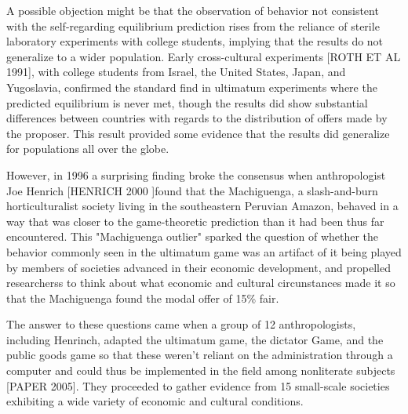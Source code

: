 \message{ !name(tese.tex)}\documentclass{article}
\begin{document}
A possible objection might be that the observation of behavior not consistent with the self-regarding equilibrium prediction rises from the reliance of sterile laboratory experiments with college students, implying that the results do not generalize to a wider population. Early cross-cultural experiments [ROTH ET AL 1991], with college students from Israel, the United States, Japan, and Yugoslavia, confirmed the standard find in ultimatum experiments where the predicted equilibrium is never met, though the results did show substantial differences between countries with regards to the distribution of offers made by the proposer. This result provided some evidence that the results did generalize for populations all over the globe. 




However, in 1996 a surprising finding broke the consensus when anthropologist Joe Henrich [HENRICH 2000 ]found that the Machiguenga, a slash-and-burn horticulturalist society living in the southeastern Peruvian Amazon, behaved in a way that was closer to the game-theoretic prediction than it had been thus far encountered. This "Machiguenga outlier" sparked the question of whether the behavior commonly seen in the ultimatum game was an artifact of it being played by members of societies advanced in their economic development, and propelled researcherss to think about what economic and cultural circunstances made it so that the Machiguenga found the modal offer of 15\% fair.

The answer to these questions came when a group of 12 anthropologists, including Henrinch, adapted the ultimatum game, the dictator Game, and the public goods game so that these weren't reliant on the administration through a computer and could thus be implemented in the field among nonliterate subjects [PAPER 2005]. They proceeded to gather evidence from 15 small-scale societies exhibiting a wide variety of economic and cultural conditions. 
\end{document}
